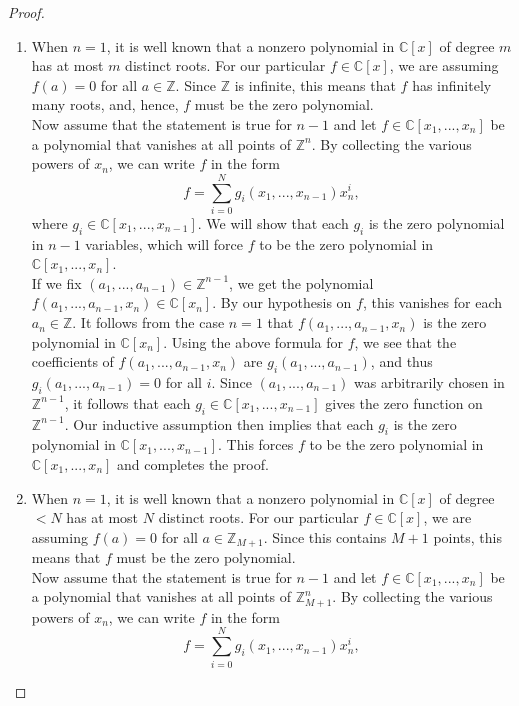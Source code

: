 \begin{proof}
    \begin{enumerate}
        \item When $n=1$, it is well known that a nonzero polynomial in $\mathbb{C}[x]$ of degree $m$ has at most $m$ distinct roots. For our particular $f\in \mathbb{C}[x]$, we are assuming $f(a)=0$ for all $a\in \mathbb{Z}$. Since $\mathbb{Z}$ is infinite, this means that $f$ has infinitely many roots, and, hence, $f$ must be the zero polynomial.\\
        Now assume that the statement is true for $n-1$ and let $f\in \mathbb{C}[x_1,...,x_n]$ be a polynomial that vanishes at all points of $\mathbb{Z}^n$. By collecting the various powers of $x_n$, we can write $f$ in the form
        $$f = \sum_{i=0}^N g_i(x_1,...,x_{n-1})x_n^i,$$
        where $g_i\in \mathbb{C}[x_1,...,x_{n-1}]$. We will show that each $g_i$ is the zero polynomial in $n-1$ variables, which will force $f$ to be the zero polynomial in $\mathbb{C}[x_1,...,x_n]$.\\
        If we fix $(a_1,...,a_{n-1})\in \mathbb{Z}^{n-1}$, we get the polynomial $f(a_1,...,a_{n-1}, x_n)\in \mathbb{C}[x_n]$. By our hypothesis on $f$, this vanishes for each $a_n\in \mathbb{Z}$. It follows from the case $n=1$ that $f(a_1,...,a_{n-1},x_n)$ is the zero polynomial in $\mathbb{C}[x_n]$. Using the above formula for $f$, we see that the coefficients of $f(a_1,...,a_{n-1},x_n)$ are $g_i(a_1,...,a_{n-1})$, and thus $g_i(a_1,...,a_{n-1})=0$ for all $i$. Since $(a_1,...,a_{n-1})$ was arbitrarily chosen in $\mathbb{Z}^{n-1}$, it follows that each $g_i\in \mathbb{C}[x_1,...,x_{n-1}]$ gives the zero function on $\mathbb{Z}^{n-1}$. Our inductive assumption then implies that each $g_i$ is the zero polynomial in $\mathbb{C}[x_1,...,x_{n-1}]$. This forces $f$ to be the zero polynomial in $\mathbb{C}[x_1,...,x_n]$ and completes the proof.
        \item When $n=1$, it is well known that a nonzero polynomial in $\mathbb{C}[x]$ of degree $<N$ has at most $N$ distinct roots. For our particular $f\in \mathbb{C}[x]$, we are assuming $f(a)=0$ for all $a\in \mathbb{Z}_{M+1}$. Since this contains $M+1$ points, this means that $f$ must be the zero polynomial.\\
        Now assume that the statement is true for $n-1$ and let $f\in \mathbb{C}[x_1,...,x_n]$ be a polynomial that vanishes at all points of $\mathbb{Z}^n_{M+1}$. By collecting the various powers of $x_n$, we can write $f$ in the form
        $$f = \sum_{i=0}^N g_i(x_1,...,x_{n-1})x_n^i,$$

\end{enumerate}
\end{proof}
